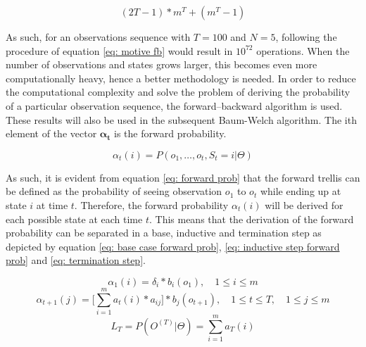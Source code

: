 \begin{equation}
    (2T-1)*m^T+(m^T-1)
\end{equation}

As such, for an observations sequence with $T = 100$ and $N = 5$, following the procedure of equation \ref{eq: motive fb} would result in $10^{72}$ operations. When the number of observations and states grows larger, this becomes even more computationally heavy, hence a better methodology is needed.  
In order to reduce the computational complexity and solve the problem of deriving the probability of a particular observation sequence, the forward–backward algorithm is used. These results will also be used in the subsequent Baum-Welch algorithm. The ith element of the vector $\mathbf{\alpha_t}$ is the forward probability.

\begin{equation}
    \alpha_t(i) = P(o_1,\ldots,o_t, S_t = i | \Theta)
    \label{eq: forward prob}
\end{equation}

As such, it is evident from equation \ref{eq: forward prob} that the forward trellis can be defined as the probability of seeing observation $o_1 $ to $o_t$ while ending up at state $i$ at time $t$. Therefore, the forward probability $\alpha_t(i)$ will be derived for each possible state at each time $t$. This means that the derivation of the forward probability can be separated in a base, inductive and termination step as depicted by equation \ref{eq: base case forward prob}, \ref{eq: inductive step forward prob} and \ref{eq: termination step}.

\begin{equation}
    \alpha_1(i) = \delta_i*b_i(o_1),
    \quad  1 \leq i \leq m
    \label{eq: base case forward prob}
\end{equation}
\begin{equation}
    \alpha_{t+1}(j) = \Big[\sum_{i=1}^m a_t(i)*a_{ij}\Big] * b_j(o_{t+1}),
    \quad 1\leq t \leq T,
     \quad 1 \leq j \leq m
    \label{eq: inductive step forward prob}
\end{equation}
\begin{equation}
    L_T = P(O^{(T)}|\Theta) = \sum_{i=1}^m a_T(i)
    \label{eq: termination step}
\end{equation}

